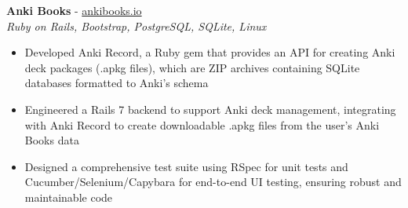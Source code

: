 \documentclass[a4paper,10pt]{article}
\begin{document}
\begin{flushleft}
\begin{itemize}
 \end{itemize}

\textbf{Anki Books} - \href{https://ankibooks.io}{ankibooks.io}\\
\textit{Ruby on Rails, Bootstrap, PostgreSQL, SQLite, Linux}\\
\begin{itemize}
    \item Developed Anki Record, a Ruby gem that provides an API for creating Anki deck packages (.apkg files), which are ZIP archives containing SQLite databases formatted to Anki’s schema
    \item Engineered a Rails 7 backend to support Anki deck management, integrating with Anki Record to create downloadable .apkg files from the user's Anki Books data
    \item Designed a comprehensive test suite using RSpec for unit tests and Cucumber/Selenium/Capybara for end-to-end UI testing, ensuring robust and maintainable code
 
 \end{itemize}


\end{flushleft}
\end{document}
